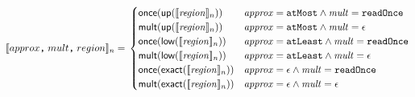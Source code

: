 \begin{dmath*}
\interp{approx\texttt{,} \; mult\texttt{,} \; region}_n = \\
   \begin{cases}
     \textsf{once}(\textsf{up}(\interp{\mathit{region}}_n)) &
       \mathit{approx} = \texttt{atMost} \wedge \mathit{mult} = \texttt{readOnce} \\
     \textsf{mult}(\textsf{up}(\interp{\mathit{region}}_n)) &
       \mathit{approx} = \texttt{atMost} \wedge \mathit{mult} = \epsilon\\
     \textsf{once}(\textsf{low}(\interp{\mathit{region}}_n)) &
       \mathit{approx} = \texttt{atLeast} \wedge \mathit{mult} = \texttt{readOnce}\\
     \textsf{mult}(\textsf{low}(\interp{\mathit{region}}_n)) &
       \mathit{approx} = \texttt{atLeast} \wedge \mathit{mult} = \epsilon \\
     \textsf{once}(\textsf{exact}(\interp{\mathit{region}}_n)) &
       \mathit{approx} = \epsilon \wedge \mathit{mult} = \texttt{readOnce}\\
     \textsf{mult}(\textsf{exact}(\interp{\mathit{region}}_n)) &
       \mathit{approx} = \epsilon \wedge \mathit{mult} = \epsilon
   \end{cases}
\end{dmath*}
